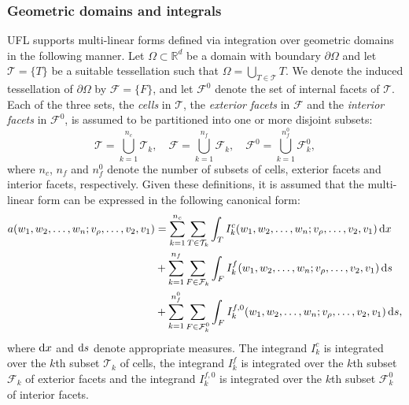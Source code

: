 \documentclass[prodmode,acmtoms]{acmsmall}
\newcommand{\R}{\mathbb{R}}
\newcommand{\dx}{\dif{}x}
\newcommand{\ds}{\dif{}s}
\begin{document}
\subsubsection{Geometric domains and integrals}
\label{subsubsec:geometric_domains_and_integrals}

UFL supports multi-linear forms defined via integration over geometric
domains in the following manner. Let $\Omega \subset \R^d$ be a domain
with boundary $\partial \Omega$ and let $\mathcal{T}= \{T\}$ be
a suitable tessellation such that $\Omega = \bigcup_{T \in \mathcal{T}}
T$. We denote the induced tessellation of $\partial \Omega$ by
$\mathcal{F} = \{F\}$, and let $\mathcal{F}^0$ denote the set of
internal facets of $\mathcal{T}$. Each of the three sets, the
\emph{cells} in $\mathcal{T}$, the \emph{exterior facets} in
$\mathcal{F}$ and the \emph{interior facets} in $\mathcal{F}^0$, is
assumed to be partitioned into one or more disjoint subsets:
\begin{equation}
  \mathcal{T} = \bigcup_{k=1}^{n_{c}} \mathcal{T}_{k},
  \quad
  \mathcal{F} = \bigcup_{k=1}^{n_{f}} \mathcal{F}_{k},
  \quad
  \mathcal{F}^0 = \bigcup_{k=1}^{n_{f}^{0}} \mathcal{F}_{k}^0,
\end{equation}
where $n_c$, $n_f$ and $n_{f}^0$ denote the number of subsets of
cells, exterior facets and interior facets, respectively. Given these
definitions, it is assumed that the multi-linear form can be expressed
in the following canonical form:
\begin{equation}
  \label{eq:canonical}
  \begin{split}
    a(w_1, w_2, \ldots, w_n; v_{\rho}, \ldots, v_2, v_1)
    &=
    \sum_{k=1}^{n_c} \sum_{T\in\mathcal{T}_{k}} \int_{T}
    I^c_k(w_1, w_2, \ldots, w_n; v_{\rho}, \ldots, v_2, v_1) \dx
    \\
    &+
    \sum_{k=1}^{n_f} \sum_{F\in\mathcal{F}_{k}} \int_{F}
    I^f_k(w_1, w_2, \ldots, w_n; v_{\rho}, \ldots, v_2, v_1) \ds
    \\
    &+
    \sum_{k=1}^{n_f^0} \sum_{F\in\mathcal{F}_{k}^0} \int_{F}
    I^{f,0}_k(w_1, w_2, \ldots, w_n; v_{\rho}, \ldots, v_2, v_1) \ds,
  \end{split}
\end{equation}
where $\dx$ and $\ds$ denote appropriate measures. The integrand
$I^{c}_{k}$ is integrated over the $k$th subset $\mathcal{T}_{k}$ of
cells, the integrand $I^{f}_{k}$ is integrated over the $k$th subset
$\mathcal{F}_{k}$ of exterior facets and the integrand $I^{f, 0}_{k}$
is integrated over the $k$th subset $\mathcal{F}_{k}^0$ of interior
facets.
\end{document}

